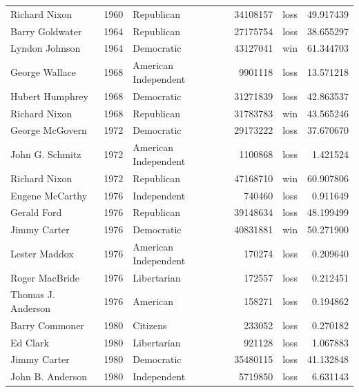 \documentclass[
  letterpaper,
  DIV=11,
  numbers=noendperiod]{scrreprt}
\begin{document}
\begin{tabular}{lrlrlr}
Richard Nixon          &  1960 &             Republican &      34108157 &   loss &  49.917439 \\
Barry Goldwater        &  1964 &             Republican &      27175754 &   loss &  38.655297 \\
Lyndon Johnson         &  1964 &             Democratic &      43127041 &    win &  61.344703 \\
George Wallace         &  1968 &   American Independent &       9901118 &   loss &  13.571218 \\
Hubert Humphrey        &  1968 &             Democratic &      31271839 &   loss &  42.863537 \\
Richard Nixon          &  1968 &             Republican &      31783783 &    win &  43.565246 \\
George McGovern        &  1972 &             Democratic &      29173222 &   loss &  37.670670 \\
John G. Schmitz        &  1972 &   American Independent &       1100868 &   loss &   1.421524 \\
Richard Nixon          &  1972 &             Republican &      47168710 &    win &  60.907806 \\
Eugene McCarthy        &  1976 &            Independent &        740460 &   loss &   0.911649 \\
Gerald Ford            &  1976 &             Republican &      39148634 &   loss &  48.199499 \\
Jimmy Carter           &  1976 &             Democratic &      40831881 &    win &  50.271900 \\
Lester Maddox          &  1976 &   American Independent &        170274 &   loss &   0.209640 \\
Roger MacBride         &  1976 &            Libertarian &        172557 &   loss &   0.212451 \\
Thomas J. Anderson     &  1976 &               American &        158271 &   loss &   0.194862 \\
Barry Commoner         &  1980 &               Citizens &        233052 &   loss &   0.270182 \\
Ed Clark               &  1980 &            Libertarian &        921128 &   loss &   1.067883 \\
Jimmy Carter           &  1980 &             Democratic &      35480115 &   loss &  41.132848 \\
John B. Anderson       &  1980 &            Independent &       5719850 &   loss &   6.631143 \\

\end{tabular}
\end{document}
